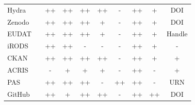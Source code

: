 \begin{table}
{\begin{tabular}{| l | c | c | c | c | c | c | c | c | c |}
            \cellcolor{first-column-blue}Hydra    && \cellcolor{green}++ & \cellcolor{green}++ & \cellcolor{green}++ & \cellcolor{green}++ & \cellcolor{red}-  &  \cellcolor{green}++ & \cellcolor{yellow}+  & \cellcolor{green}DOI \\
            \cline{3-10}\cline{1-1}
            \cellcolor{first-column-blue}Zenodo   && \cellcolor{green}++ & \cellcolor{green}++ & \cellcolor{green}++ & \cellcolor{yellow}+  & \cellcolor{red}-  &  \cellcolor{green}++ & \cellcolor{yellow}+  & \cellcolor{green}DOI \\
            \cline{3-10}\cline{1-1}
            \cellcolor{first-column-blue}EUDAT    && \cellcolor{green}++ & \cellcolor{green}++ & \cellcolor{green}++ & \cellcolor{yellow}+  & \cellcolor{red}-  &  \cellcolor{green}++ & \cellcolor{yellow}+  & \cellcolor{green}Handle \\
            \cline{3-10}\cline{1-1}
            \cellcolor{first-column-blue}iRODS    && \cellcolor{green}++ & \cellcolor{green}++ & \cellcolor{red}-  & \cellcolor{red}-  & \cellcolor{red}-  &  \cellcolor{green}++ & \cellcolor{yellow}+  & \cellcolor{red}- \\
            \cline{3-10}\cline{1-1}
            \cellcolor{first-column-blue}CKAN     && \cellcolor{green}++ & \cellcolor{green}++ & \cellcolor{green}++ & \cellcolor{green}++ & \cellcolor{red}-  &  \cellcolor{green}++ & \cellcolor{yellow}+  & \cellcolor{yellow}+ \\
            \cline{3-10}\cline{1-1}
            \cellcolor{first-column-blue}ACRIS    && \cellcolor{red}-  & \cellcolor{yellow}+  & \cellcolor{yellow}+  & \cellcolor{yellow}+  & \cellcolor{red}-  &  \cellcolor{green}++ & \cellcolor{red}-  & \cellcolor{yellow}+ \\
            \cline{3-10}\cline{1-1}
            \cellcolor{first-column-blue}PAS      && \cellcolor{green}++ & \cellcolor{green}++ & \cellcolor{green}++ & \cellcolor{red}-  & \cellcolor{green}++ &  \cellcolor{green}++ & \cellcolor{red}-  & \cellcolor{green}URN \\
            \cline{3-10}\cline{1-1}
            \cellcolor{first-column-blue}GitHub   && \cellcolor{green}++ & \cellcolor{yellow}+  & \cellcolor{green}++ & \cellcolor{green}++ & \cellcolor{red}-  &  \cellcolor{green}++ & \cellcolor{green}++ & \cellcolor{green}DOI \\
            \cline{3-10}\cline{1-1}
        \end{tabular}
    }
\end{table}

